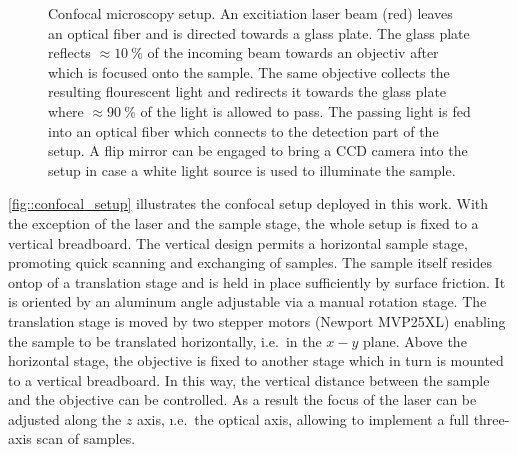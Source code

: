 		\begin{figure}[htb]
			\centering
			\caption[Confocal microscopy setup]{Confocal microscopy setup. An excitiation laser beam (red) leaves an optical fiber and is directed towards a glass plate. The glass plate reflects $\approx \SI{10}{\percent}$ of the incoming beam towards an objectiv after which is focused onto the sample. The same objective collects the resulting flourescent light and redirects it towards the glass plate where $\approx \SI{90}{\percent}$ of the light is allowed to pass. The passing \fl light is fed into an optical fiber which connects to the detection part of the setup. A flip mirror can be engaged to bring a CCD camera into the setup in case a white light source is used to illuminate the sample.}
			\label{fig::confocal_setup}
		\end{figure}

		\autoref{fig::confocal_setup} illustrates the confocal setup deployed in this work.
		With the exception of the laser and the sample stage, the whole setup is fixed to a vertical breadboard.
		The vertical design permits a horizontal sample stage, promoting quick scanning and exchanging of samples.
		The sample itself resides ontop of a translation stage and is held in place sufficiently by surface friction.
		It is oriented by an aluminum angle adjustable via a manual rotation stage.
		The translation stage is moved by two stepper motors (Newport MVP25XL) enabling the sample to be translated horizontally, i.e.\ in the $x-y$ plane.
		Above the horizontal stage, the objective is fixed to another stage which in turn is mounted to a vertical breadboard.
		In this way, the vertical distance between the sample and the objective can be controlled. As a result the focus of the laser can be adjusted along the $z$ axis, \i.e.\ the optical axis, allowing to implement a full three-axis scan of samples.


